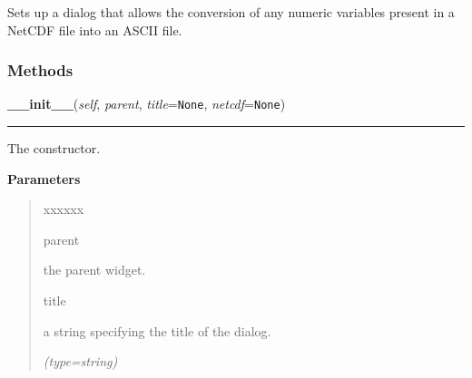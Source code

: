 Sets up a dialog that allows the conversion of any numeric variables 
present in a NetCDF file into an ASCII file.



  \subsubsection{Methods}

    \label{nMOLDYN:GUI:NetCDFToASCIIConversionDialog:NetCDFToASCIIConversionDialog:__init__}

    \vspace{0.5ex}

\hspace{.8\funcindent}\begin{boxedminipage}{\funcwidth}

    \raggedright \textbf{\_\_init\_\_}(\textit{self}, \textit{parent}, \textit{title}={\tt None}, \textit{netcdf}={\tt None})

    \vspace{-1.5ex}

    \rule{\textwidth}{0.5\fboxrule}
\setlength{\parskip}{2ex}
    The constructor.

\setlength{\parskip}{1ex}
      \textbf{Parameters}
      \vspace{-1ex}

      \begin{quote}
        \begin{Ventry}{xxxxxx}

          \item[parent]

          the parent widget.

          \item[title]

          a string specifying the title of the dialog.

            {\it (type=string)}

        \end{Ventry}

      \end{quote}

    \end{boxedminipage}

